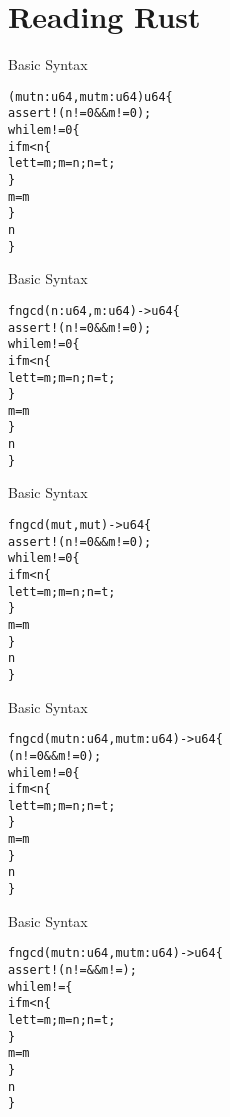 \section{Reading Rust}


\begin{frame}[fragile]{Basic Syntax}
\begin{alltt}
(mut n: u64, mut m: u64) \hi{->} u64 \{
    assert!(n != 0 && m != 0);
    while m != 0 \{
        if m < n \{
            let t = m; m = n; n = t;
        \}
        m = m % n;
    \}
    n
\}
\end{alltt}
\end{frame}


\begin{frame}[fragile]{Basic Syntax}
\begin{alltt}
fn gcd( n: u64,  m: u64) -> u64 \{
    assert!(n != 0 && m != 0);
    while m != 0 \{
        if m < n \{
            let t = m; m = n; n = t;
        \}
        m = m % n;
    \}
    n
\}
\end{alltt}
\end{frame}


\begin{frame}[fragile]{Basic Syntax}
\begin{alltt}
fn gcd(mut , mut ) -> u64 \{
    assert!(n != 0 && m != 0);
    while m != 0 \{
        if m < n \{
            let t = m; m = n; n = t;
        \}
        m = m % n;
    \}
    n
\}
\end{alltt}
\end{frame}


\begin{frame}[fragile]{Basic Syntax}
\begin{alltt}
fn gcd(mut n: u64, mut m: u64) -> u64 \{
    (n != 0 && m != 0);
    while m != 0 \{
        if m < n \{
            let t = m; m = n; n = t;
        \}
        m = m % n;
    \}
    n
\}
\end{alltt}
\end{frame}


\begin{frame}[fragile]{Basic Syntax}
\begin{alltt}
fn gcd(mut n: u64, mut m: u64) -> u64 \{
    assert!(n !=  && m != );
    while m !=  \{
        if m < n \{
            let t = m; m = n; n = t;
        \}
        m = m % n;
    \}
    n
\}
\end{alltt}
\end{frame}

